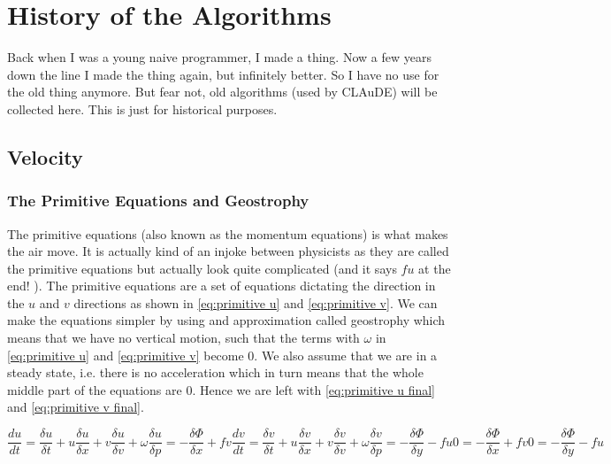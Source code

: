 \section{History of the Algorithms} \label{sec:history}
Back when I was a young naive programmer, I made a thing. Now a few years down the line I made the thing again, but infinitely better. So I have no use for the old thing anymore. But fear not,
old algorithms (used by CLAuDE) will be collected here. This is just for historical purposes.

\subsection{Velocity}
\subsubsection{The Primitive Equations and Geostrophy}
The primitive equations (also known as the momentum equations) is what makes the air move. It is actually kind of an injoke between physicists as they are called the primitive equations but 
actually look quite complicated (and it says $fu$ at the end! \cite{simon}). The primitive equations are a set of equations dictating the direction in the $u$ and $v$ directions as shown in 
\autoref{eq:primitive u} and \autoref{eq:primitive v}. We can make the equations simpler by using and approximation called geostrophy which means that we have no vertical motion, such that the
terms with $\omega$ in \autoref{eq:primitive u} and \autoref{eq:primitive v} become 0. We also assume that we are in a steady state, i.e. there is no acceleration which in turn means that the 
whole middle part of the equations are $0$. Hence we are left with \autoref{eq:primitive u final} and \autoref{eq:primitive v final}.

\begin{subequations}
    \begin{equation}
        \frac{du}{dt} = \frac{\delta u}{\delta t} + u\frac{\delta u}{ \delta x} + v\frac{\delta u}{\delta v} + \omega\frac{\delta u}{\delta p} = -\frac{\delta \Phi}{\delta x} + fv
        \label{eq:primitive u}
    \end{equation}
    \begin{equation}
        \frac{dv}{dt} = \frac{\delta v}{\delta t} + u\frac{\delta v}{ \delta x} + v\frac{\delta v}{\delta v} + \omega\frac{\delta v}{\delta p} = -\frac{\delta \Phi}{\delta y} - fu
        \label{eq:primitive v}
    \end{equation}

    \begin{equation}
        0 = -\frac{\delta \Phi}{\delta x} + fv
        \label{eq:primitive u final}
    \end{equation}
    \begin{equation}
        0 = -\frac{\delta \Phi}{\delta y} - fu
        \label{eq:primitive v final}
    \end{equation}
\end{subequations}

